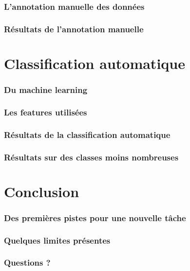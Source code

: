 \documentclass[10pt]{beamer}
\begin{document}
\begin{frame}
  \frametitle{L'annotation manuelle des données}
\end{frame}

\begin{frame}
  \frametitle{Résultats de l'annotation manuelle}
\end{frame}

\section{Classification automatique}
\label{sec:machinelearning}

\begin{frame}
  \frametitle{Du machine learning}
\end{frame}

\begin{frame}
  \frametitle{Les features utilisées}
\end{frame}

\begin{frame}
  \frametitle{Résultats de la classification automatique}
\end{frame}

\begin{frame}
  \frametitle{Résultats sur des classes moins nombreuses}
\end{frame}

\section{Conclusion}
\label{sec:conclusion}

\begin{frame}
  \frametitle{Des premières pistes pour une nouvelle tâche}
\end{frame}

\begin{frame}
  \frametitle{Quelques limites présentes}
\end{frame}

\begin{frame}
  \frametitle{Questions ?}
\end{frame}
\end{document}
